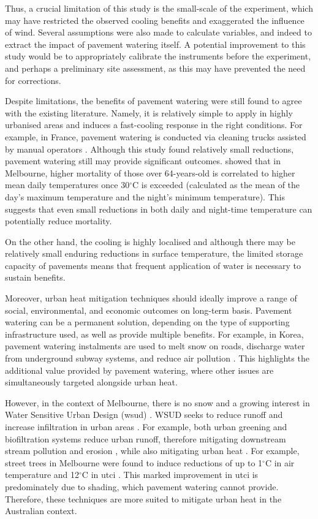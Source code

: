 \documentclass[final,3p,times,authoryear]{elsarticle}
\begin{document}
Thus, a crucial limitation of this study is the small-scale of the experiment, which may have restricted the observed cooling benefits and exaggerated the influence of wind. Several assumptions were also made to calculate variables, and indeed to extract the impact of pavement watering itself. A potential improvement to this study would be to appropriately calibrate the instruments before the experiment, and perhaps a preliminary site assessment, as this may have prevented the need for corrections.

Despite limitations, the benefits of pavement watering were still found to agree with the existing literature. Namely, it is relatively simple to apply in highly urbanised areas and induces a fast-cooling response in the right conditions. For example, in France, pavement watering is conducted via cleaning trucks assisted by manual operators \citep{Hendel2014}. Although this study found relatively small reductions, pavement watering still may provide significant outcomes. \cite{Nicholls2008} showed that in Melbourne, higher mortality of those over 64-years-old is correlated to higher mean daily temperatures once 30$^{\circ}$C is exceeded (calculated as the mean of the day's maximum temperature and the night's minimum temperature). This suggests that even small reductions in both daily and night-time temperature can potentially reduce mortality.

On the other hand, the cooling is highly localised and although there may be relatively small enduring reductions in surface temperature, the limited storage capacity of pavements means that frequent application of water is necessary to sustain benefits.

Moreover, urban heat mitigation techniques should ideally improve a range of social, environmental, and economic outcomes on long-term basis. Pavement watering can be a permanent solution, depending on the type of supporting infrastructure used, as well as provide multiple benefits. For example, in Korea, pavement watering instalments are used to melt snow on roads, discharge water from underground subway systems, and reduce air pollution \citep{Kim2014a,Na2021}. This highlights the additional value provided by pavement watering, where other issues are simultaneously targeted alongside urban heat.

However, in the context of Melbourne, there is no snow and a growing interest in Water Sensitive Urban Design (\gls{wsud}) \citep{Dahlenburg2012}. WSUD seeks to reduce runoff and increase infiltration in urban areas \citep{Broadbent2018b}. For example, both urban greening and biofiltration systems reduce urban runoff, therefore mitigating downstream stream pollution and erosion \citep{Hatt2004,Walsh2012}, while also mitigating urban heat \citep{Demuzere2014}. For example, street trees in Melbourne were found to induce reductions of up to 1$^{\circ}$C in air temperature and 12$^{\circ}$C in \gls{utci} \citep{Coutts2015}. This marked improvement in \gls{utci} is predominately due to shading, which pavement watering cannot provide. Therefore, these techniques are more suited to mitigate urban heat in the Australian context.
\end{document}

